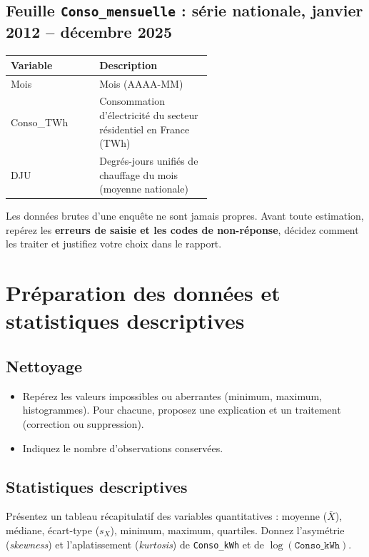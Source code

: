 \documentclass[11pt,a4paper]{article}
\newcommand{\var}[1]{\texttt{#1}}
\begin{document}
\subsection*{Feuille \var{Conso\_mensuelle} : série nationale, janvier 2012 -- décembre 2025}

{\small
\begin{tabular}{>{\ttfamily}l p{0.56\linewidth}}
\toprule
\normalfont\bfseries Variable & \bfseries Description \\
\midrule
Mois & Mois (AAAA-MM) \\
Conso\_TWh & Consommation d'électricité du secteur résidentiel en France (TWh) \\
DJU & Degrés-jours unifiés de chauffage du mois (moyenne nationale) \\
\bottomrule
\end{tabular}
}

\begin{afaire}
Les données brutes d'une enquête ne sont jamais propres. Avant toute estimation, repérez les \textbf{erreurs de saisie et les codes de non-réponse}, décidez comment les traiter et justifiez votre choix dans le rapport.
\end{afaire}

\newpage
\section{Préparation des données et statistiques descriptives}

\subsection{Nettoyage}
\begin{itemize}
  \item Repérez les valeurs impossibles ou aberrantes (minimum, maximum, histogrammes). Pour chacune, proposez une explication et un traitement (correction ou suppression).
  \item Indiquez le nombre d'observations conservées.
\end{itemize}

\subsection{Statistiques descriptives}
Présentez un tableau récapitulatif des variables quantitatives : moyenne ($\bar X$), médiane, écart-type ($s_X$), minimum, maximum, quartiles. Donnez l'asymétrie (\textit{skewness}) et l'aplatissement (\textit{kurtosis}) de \var{Conso\_kWh} et de $\log(\var{Conso\_kWh})$.
\end{document}
